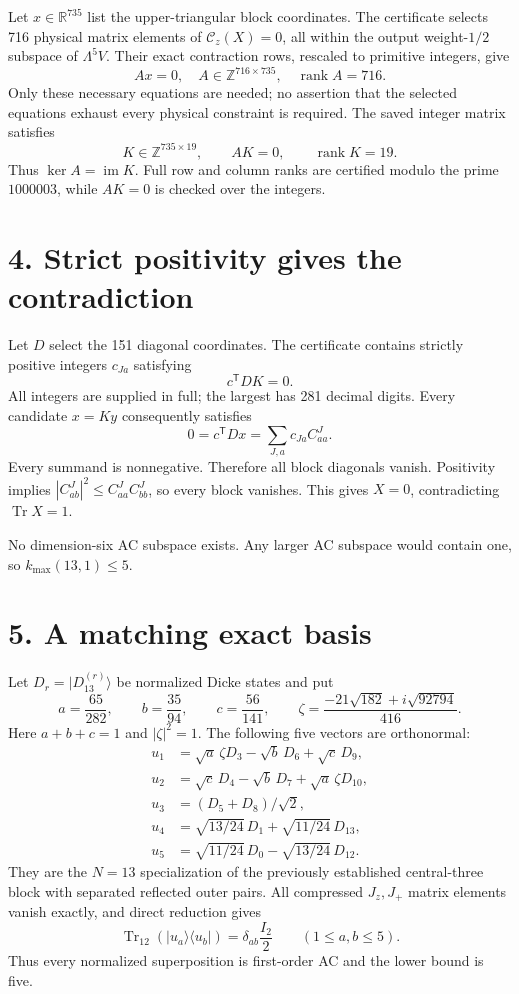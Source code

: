 \documentclass[11pt]{article}
\newcommand{\Tr}{\operatorname{Tr}}
\begin{document}
Let $x\in\mathbb R^{735}$ list the upper-triangular block coordinates. The certificate selects 716 physical matrix elements of $\mathcal C_z(X)=0$, all within the output weight-$1/2$ subspace of $\Lambda^5V$. Their exact contraction rows, rescaled to primitive integers, give
\[
Ax=0,\quad A\in\mathbb Z^{716\times735},\quad\operatorname{rank}A=716.
\]
Only these necessary equations are needed; no assertion that the selected equations exhaust every physical constraint is required. The saved integer matrix satisfies
\[
K\in\mathbb Z^{735\times19},\qquad AK=0,\qquad\operatorname{rank}K=19.
\]
Thus $\ker A=\operatorname{im}K$. Full row and column ranks are certified modulo the prime $1000003$, while $AK=0$ is checked over the integers.

\section*{4. Strict positivity gives the contradiction}
Let $D$ select the 151 diagonal coordinates. The certificate contains strictly positive integers $c_{Ja}$ satisfying
\[
\boxed{c^{\mathsf T}DK=0.}
\]
All integers are supplied in full; the largest has 281 decimal digits. Every candidate $x=Ky$ consequently satisfies
\[
0=c^{\mathsf T}Dx=\sum_{J,a}c_{Ja}C^J_{aa}.
\]
Every summand is nonnegative. Therefore all block diagonals vanish. Positivity implies $|C^J_{ab}|^2\le C^J_{aa}C^J_{bb}$, so every block vanishes. This gives $X=0$, contradicting $\Tr X=1$.

No dimension-six AC subspace exists. Any larger AC subspace would contain one, so $k_{\max}(13,1)\le5$.

\section*{5. A matching exact basis}
Let $D_r=|D_{13}^{(r)}\rangle$ be normalized Dicke states and put
\[
a=\frac{65}{282},\qquad b=\frac{35}{94},\qquad c=\frac{56}{141},\qquad
\zeta=\frac{-21\sqrt{182}+i\sqrt{92794}}{416}.
\]
Here $a+b+c=1$ and $|\zeta|^2=1$. The following five vectors are orthonormal:
\[
\begin{aligned}
u_1&=\sqrt a\,\zeta D_3-\sqrt b\,D_6+\sqrt c\,D_9,\\
u_2&=\sqrt c\,D_4-\sqrt b\,D_7+\sqrt a\,\zeta D_{10},\\
u_3&=(D_5+D_8)/\sqrt2,\\
u_4&=\sqrt{13/24}\,D_1+\sqrt{11/24}\,D_{13},\\
u_5&=\sqrt{11/24}\,D_0-\sqrt{13/24}\,D_{12}.
\end{aligned}
\]
They are the $N=13$ specialization of the previously established central-three block with separated reflected outer pairs. All compressed $J_z,J_+$ matrix elements vanish exactly, and direct reduction gives
\[
\Tr_{12}(|u_a\rangle\langle u_b|)=\delta_{ab}\frac{I_2}{2}
\qquad(1\le a,b\le5).
\]
Thus every normalized superposition is first-order AC and the lower bound is five.
\end{document}
